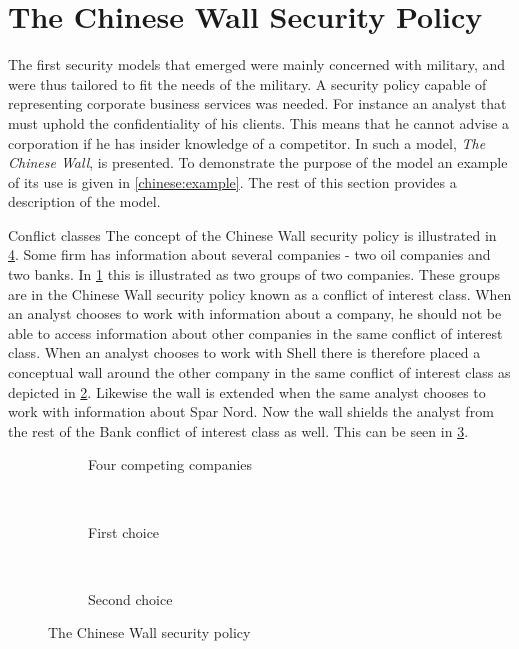 \section{The Chinese Wall Security Policy}
The first security models that emerged were mainly concerned with military, and were thus tailored to fit the needs of the military.
A security policy capable of representing corporate business services was needed.
For instance an analyst that must uphold the confidentiality of his clients.
This means that he cannot advise a corporation if he has insider knowledge of a competitor.
In \citet{brewer1989chinese} such a model, \emph{The Chinese Wall}, is presented.
To demonstrate the purpose of the model an example of its use is given in \cref{chinese:example}.
The rest of this section provides a description of the model.

\begin{example}{Conflict classes}\label{chinese:example}
The concept of the Chinese Wall security policy is illustrated in \cref{chinese:illu}.
Some firm has information about several companies - two oil companies and two banks.
In \cref{chinese:illu:situation} this is illustrated as two groups of two companies.
These groups are in the Chinese Wall security policy known as a conflict of interest class.
When an analyst chooses to work with information about a company, he should not be able to access information about other companies in the same conflict of interest class.
When an analyst chooses to work with Shell there is therefore placed a conceptual wall around the other company in the same conflict of interest class as depicted in \cref{chinese:illu:choice1}.
Likewise the wall is extended when the same analyst chooses to work with information about Spar Nord.
Now the wall shields the analyst from the rest of the Bank conflict of interest class as well.
This can be seen in \cref{chinese:illu:choice2}.
\end{example}

\begin{figure}
\centering
    \begin{subfigure}[t]{0.3\textwidth}
        \resizebox{\linewidth}{!}{}
        \caption{Four competing companies}
        \label{chinese:illu:situation}
    \end{subfigure}
    ~
    \begin{subfigure}[t]{0.3\textwidth}
        \resizebox{\linewidth}{!}{}
        \caption{First choice}
        \label{chinese:illu:choice1}
    \end{subfigure}
    ~
    \begin{subfigure}[t]{0.3\textwidth}
        \resizebox{\linewidth}{!}{}
        \caption{Second choice}
        \label{chinese:illu:choice2}
    \end{subfigure}
    \caption{The Chinese Wall security policy}\label{chinese:illu}
\end{figure}


